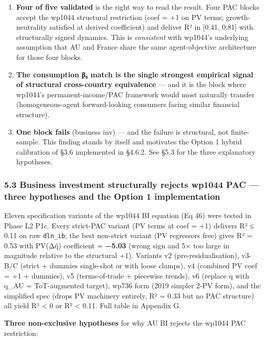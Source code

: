 \documentclass[
]{article}
\providecommand{\tightlist}{%
  \setlength{\itemsep}{0pt}\setlength{\parskip}{0pt}}
\begin{document}
\begin{enumerate}
\def\labelenumi{\arabic{enumi}.}
\tightlist
\item
  \textbf{Four of five validated} is the right way to read the result.
  Four PAC blocks accept the wp1044 structural restriction (coef = +1 on
  PV terms; growth-neutrality satisfied at derived coefficient) and
  deliver R² in {[}0.41, 0.81{]} with structurally signed dynamics. This
  is \emph{consistent} with wp1044's underlying assumption that AU and
  France share the same agent-objective architecture for those four
  blocks.
\item
  \textbf{The consumption β₀ match is the single strongest empirical
  signal of structural cross-country equivalence} --- and it is the
  block where wp1044's permanent-income/PAC framework would most
  naturally transfer (homogeneous-agent forward-looking consumers facing
  similar financial structure).
\item
  \textbf{One block fails} (business inv) --- and the failure is
  structural, not finite-sample. This finding stands by itself and
  motivates the Option 1 hybrid calibration of §3.6 implemented in
  §4.6.2. See §5.3 for the three explanatory hypotheses.
\end{enumerate}

\subsubsection{5.3 Business investment structurally rejects wp1044 PAC
--- three hypotheses and the Option 1
implementation}\label{business-investment-structurally-rejects-wp1044-pac-three-hypotheses-and-the-option-1-implementation}

Eleven specification variants of the wp1044 BI equation (Eq 46) were
tested in Phase L2 P1c. Every strict-PAC variant (PV terms at coef = +1)
delivers R² ≤ 0.11 on raw \texttt{dln\_ib}; the best non-strict variant
(PV regressors free) gives R² = 0.53 with PV(Δq̂) coefficient =
\textbf{−5.03} (wrong sign and 5× too large in magnitude relative to the
structural +1). Variants v2 (pre-residualisation), v3-B/C (strict +
dummies single-shot or with loose clamps), v4 (combined PV coef = +1 +
dummies), v5 (terms-of-trade + piecewise trends), v6 (replace q with
q\_AU = ToT-augmented target), wp736 form (2019 simpler 2-PV form), and
the simplified spec (drops PV machinery entirely, R² = 0.33 but no PAC
structure) all yield R² \textless{} 0 or R² \textless{} 0.11. Full table
in Appendix G.

\textbf{Three non-exclusive hypotheses} for why AU BI rejects the wp1044
PAC restriction:
\end{document}
